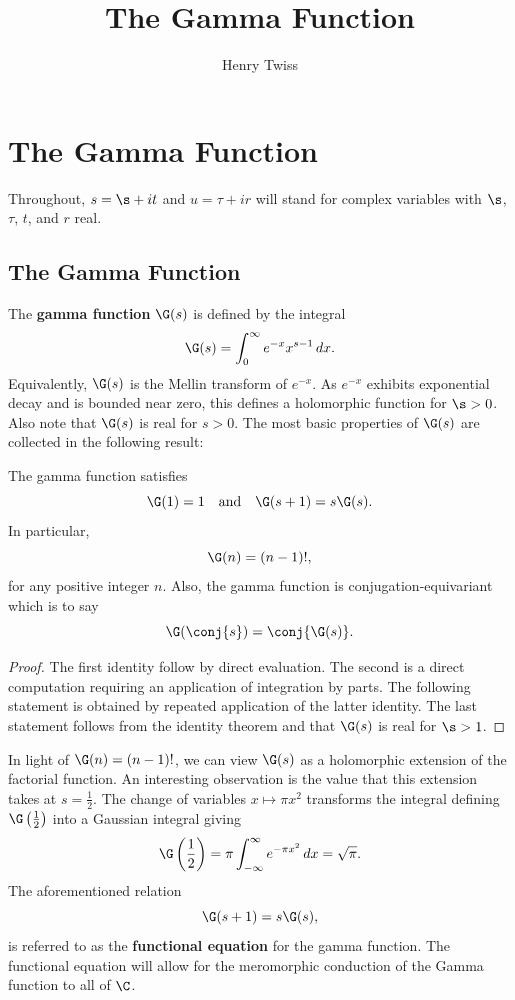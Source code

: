 \documentclass[12pt]{article}
\title{The Gamma Function}
\author{Henry Twiss}
\begin{document}
  \date{}
  \maketitle
  \tableofcontents
  \section{The Gamma Function}\label{sec:The_Gamma_Function}
    Throughout, \(s = \s+it\) and \(u = \tau+ir\) will stand for complex variables with \(\s\), \(\tau\), \(t\), and \(r\) real.
    \subsection{The Gamma Function}
      The \textbf{gamma function} \(\G(s)\) is defined by the integral
      \[
        \G(s) = \int_{0}^{\infty}e^{-x}x^{s-1}\,dx.
      \]
      Equivalently, \(\G(s)\) is the Mellin transform of \(e^{-x}\). As \(e^{-x}\) exhibits exponential decay and is bounded near zero, this defines a holomorphic function for \(\s > 0\). Also note that \(\G(s)\) is real for \(s > 0\). The most basic properties of \(\G(s)\) are collected in the following result:

      \begin{proposition}\label{prop:Factorial_properties_of_gamma_function}
        The gamma function satisfies
        \[
          \G(1) = 1 \quad \text{and} \quad \G(s+1) = s\G(s).
        \]
        In particular,
        \[
          \G(n) = (n-1)!,
        \]
        for any positive integer \(n\). Also, the gamma function is conjugation-equivariant which is to say
        \[
          \G(\conj{s}) = \conj{\G(s)}.
        \]
      \end{proposition}
      \begin{proof}
        The first identity follow by direct evaluation. The second is a direct computation requiring an application of integration by parts. The following statement is obtained by repeated application of the latter identity. The last statement follows from the identity theorem and that \(\G(s)\) is real for \(\s > 1\).
      \end{proof}

      In light of \(\G(n) = (n-1)!\), we can view \(\G(s)\) as a holomorphic extension of the factorial function. An interesting observation is the value that this extension takes at \(s = \frac{1}{2}\). The change of variables \(x \mapsto \pi x^{2}\) transforms the integral defining \(\G\left(\frac{1}{2}\right)\) into a Gaussian integral giving
      \begin{equation}\label{equ:gamma_function_at_1/2}
        \G\left(\frac{1}{2}\right) = \pi\int_{-\infty}^{\infty}e^{-\pi x^{2}}\,dx = \sqrt{\pi}.
      \end{equation}
      The aforementioned relation
      \[
        \G(s+1) = s\G(s),
      \]
      is referred to as the \textbf{functional equation} for the gamma function. The functional equation will allow for the meromorphic conduction of the Gamma function to all of \(\C\).
\end{document}
